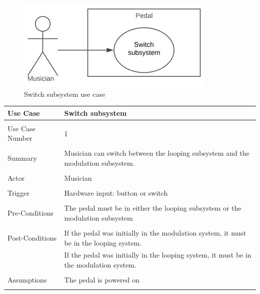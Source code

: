                \begin{figure}[!ht]
                    \centering
                    \includegraphics[width=.5\textwidth]{diagrams/use_cases/uc-switch.JPG}
                    \caption{Switch subsystem use case}
                    \label{fig:uc-switch}
                \end{figure}
        \clearpage
        \begin{table}[!ht]
            \centering
            \begin{tabular}{ l l  }
                Use Case & Switch subsystem  \\
                \hline \\
                Use Case Number & 1 \\ \\
                Summary & Musician can switch between the looping subsystem and the modulation subsystem. \\ \\
                Actor & Musician \\ \\
                Trigger & Hardware input: button or switch \\ \\
                
                Pre-Conditions & The pedal must be in either the looping subsystem or the modulation subsystem  \\ \\
                Post-Conditions & If the pedal was initially in the modulation system, it must be in the looping system. \\ 
                & If the pedal was initially in the looping system, it must be in the modulation system. \\ \\
                Assumptions & The pedal is powered on \\ \\
            \end{tabular}
        \end{table}

